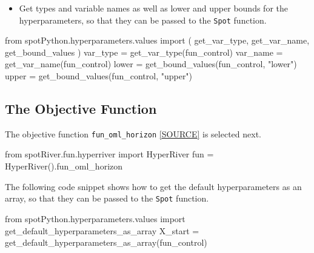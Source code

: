 \documentclass[
  letterpaper,
  DIV=11,
  numbers=noendperiod]{scrreprt}
\newenvironment{Shaded}{\begin{snugshade}}{\end{snugshade}}
\newcommand{\ImportTok}[1]{\textcolor[rgb]{0.00,0.46,0.62}{#1}}
\newcommand{\NormalTok}[1]{\textcolor[rgb]{0.00,0.23,0.31}{#1}}
\newcommand{\OperatorTok}[1]{\textcolor[rgb]{0.37,0.37,0.37}{#1}}
\newcommand{\StringTok}[1]{\textcolor[rgb]{0.13,0.47,0.30}{#1}}
\providecommand{\tightlist}{%
  \setlength{\itemsep}{0pt}\setlength{\parskip}{0pt}}\usepackage{longtable,booktabs,array}
\begin{document}
\begin{itemize}
\tightlist
\item
  Get types and variable names as well as lower and upper bounds for the
  hyperparameters, so that they can be passed to the \texttt{Spot}
  function.
\end{itemize}

\begin{Shaded}
\begin{Highlighting}[]
\ImportTok{from}\NormalTok{ spotPython.hyperparameters.values }\ImportTok{import}\NormalTok{ (}
\NormalTok{    get\_var\_type,}
\NormalTok{    get\_var\_name,}
\NormalTok{    get\_bound\_values}
\NormalTok{    )}
\NormalTok{var\_type }\OperatorTok{=}\NormalTok{ get\_var\_type(fun\_control)}
\NormalTok{var\_name }\OperatorTok{=}\NormalTok{ get\_var\_name(fun\_control)}
\NormalTok{lower }\OperatorTok{=}\NormalTok{ get\_bound\_values(fun\_control, }\StringTok{"lower"}\NormalTok{)}
\NormalTok{upper }\OperatorTok{=}\NormalTok{ get\_bound\_values(fun\_control, }\StringTok{"upper"}\NormalTok{)}
\end{Highlighting}
\end{Shaded}

\hypertarget{sec-the-objective-function-51}{%
\subsection{The Objective
Function}\label{sec-the-objective-function-51}}

The objective function \texttt{fun\_oml\_horizon}
\href{https://github.com/sequential-parameter-optimization/spotRiver/blob/main/src/spotRiver/fun/hyperriver.py}{{[}SOURCE{]}}
is selected next.

\begin{Shaded}
\begin{Highlighting}[]
\ImportTok{from}\NormalTok{ spotRiver.fun.hyperriver }\ImportTok{import}\NormalTok{ HyperRiver}
\NormalTok{fun }\OperatorTok{=}\NormalTok{ HyperRiver().fun\_oml\_horizon}
\end{Highlighting}
\end{Shaded}

The following code snippet shows how to get the default hyperparameters
as an array, so that they can be passed to the \texttt{Spot} function.

\begin{Shaded}
\begin{Highlighting}[]
\ImportTok{from}\NormalTok{ spotPython.hyperparameters.values }\ImportTok{import}\NormalTok{ get\_default\_hyperparameters\_as\_array}
\NormalTok{X\_start }\OperatorTok{=}\NormalTok{ get\_default\_hyperparameters\_as\_array(fun\_control)}
\end{Highlighting}
\end{Shaded}
\end{document}
